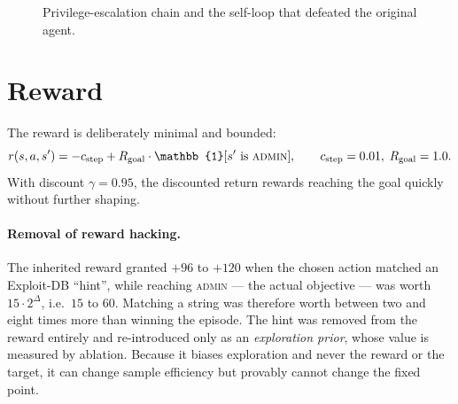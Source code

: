 \documentclass[11pt,a4paper]{report}
\begin{document}
\begin{figure}[h]
\centering
{}
\caption{Privilege-escalation chain and the self-loop that defeated the original
agent.}
\label{fig:mdp}
\end{figure}

\section{Reward}
The reward is deliberately minimal and bounded:
\[
r(s,a,s') = -c_{\text{step}} + R_{\text{goal}} \cdot \mathbb{1}[s' \text{ is } \textsc{admin}],
\qquad c_{\text{step}} = 0.01,\; R_{\text{goal}} = 1.0 .
\]
With discount $\gamma = 0.95$, the discounted return rewards reaching the goal
quickly without further shaping.

\paragraph{Removal of reward hacking.} The inherited reward granted $+96$ to
$+120$ when the chosen action matched an Exploit-DB ``hint'', while reaching
\textsc{admin} --- the actual objective --- was worth $15 \cdot 2^{\Delta}$,
i.e.\ $15$ to $60$. Matching a string was therefore worth between two and eight
times more than winning the episode. The hint was removed from the reward
entirely and re-introduced only as an \emph{exploration prior}, whose value is
measured by ablation. Because it biases exploration and never the reward or the
target, it can change sample efficiency but provably cannot change the fixed
point.
\end{document}
